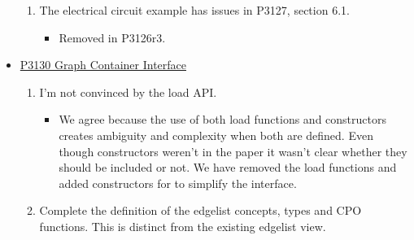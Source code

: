 \begin{itemize}
\begin{enumerate}
                  \item The electrical circuit example has issues in P3127, section 6.1.
                        \begin{itemize}
                              \item Removed in P3126r3.
                        \end{itemize}
            \end{enumerate}
      \item \href{https://www.wg21.link/P3130}{P3130 Graph Container Interface}
            \begin{enumerate}
                  \item I'm not convinced by the load API.
                        \begin{itemize}
                              \item We agree because the use of both load functions and constructors creates ambiguity and complexity when both are defined.
                                    Even though constructors weren't in the paper it wasn't clear whether they should be included or not.
                                    We have removed the load functions and added constructors for  to simplify the interface.
                        \end{itemize}
                        \item Complete the definition of the edgelist concepts, types and CPO functions. This is distinct from the existing edgelist view.
                  \end{enumerate}
\end{itemize}
